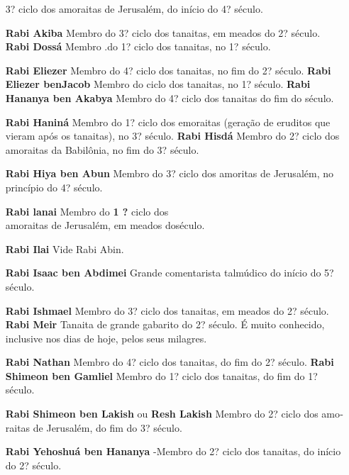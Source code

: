 \begin{itemize}
3? ciclo dos amoraitas de Jerusalém, do início do 4? século.

\item[\textbf{Rabi Akiba}] Membro do 3? ciclo dos tanaitas, em meados do 2?
século. \textbf{Rabi Dossá} Membro .do 1? ciclo dos tanaitas, no 1?
século.

\item[\textbf{Rabi Eliezer}] Membro do 4? ciclo dos tanaitas, no fim do 2?
século. \textbf{Rabi Eliezer benJacob} Membro do
ciclo dos tanaitas, no 1? século. \textbf{Rabi Hananya ben Akabya}
Mem­bro do 4? ciclo dos tanaitas do fim do
século.

\item[\textbf{Rabi Haniná}] Membro do 1? ciclo dos emoraitas (geração de
eruditos que vieram após os tanaitas), no 3? século. \textbf{Rabi Hisdá} 
Membro do 2? ciclo dos amoraitas da Babilônia, no fim do 3? século.

\item[\textbf{Rabi Hiya ben Abun}] Membro do 3? ciclo dos amoritas de
Jerusalém, no princípio do 4? século.

\item[\textbf{Rabi lanai} Membro do \textbf{1 ?}] ciclo dos\\
amoraitas de Jerusalém, em meados doséculo.

\item[\textbf{Rabi Ilai}] Vide Rabi Abin.

\item[\textbf{Rabi Isaac ben Abdimei}] Grande co­mentarista talmúdico do
início do 5? século.

\item[\textbf{Rabi Ishmael}] Membro do 3? ciclo dos tanaitas, em meados do 2?
século. \textbf{Rabi Meir} Tanaita de grande gabari­to do 2? século. É
muito conhecido, inclusive nos dias de hoje, pelos seus milagres.

\item[\textbf{Rabi Nathan}] Membro do 4? ciclo dos tanaitas, do fim do 2?
século. \textbf{Rabi Shimeon ben Gamliel} Mem­bro do 1? ciclo dos
tanaitas, do fim do 1? século.

\item[\textbf{Rabi Shimeon ben Lakish} ou \textbf{Resh Lakish}] Membro do 2?
ciclo dos amo­raitas de Jerusalém, do fim do 3? sé­culo.

\item[\textbf{Rabi Yehoshuá ben Hananya}] -Membro do 2? ciclo dos tanaitas, do
início do 2? século.


\end{itemize}
